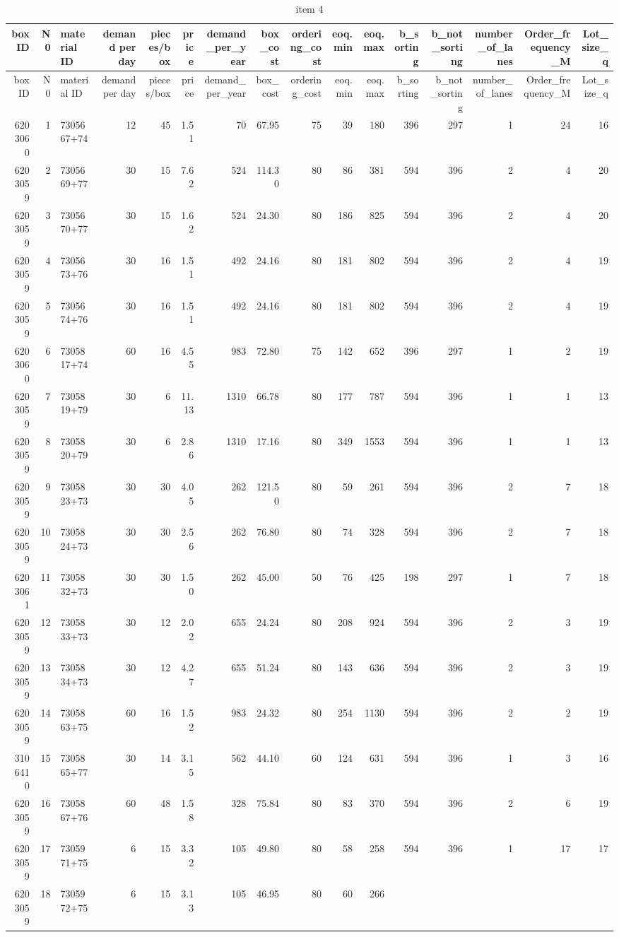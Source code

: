 \documentclass[
]{article}
\begin{document}
\begin{longtable}[]{@{}rrlrrrrrrrrrrrrr@{}}
\caption{item 4}\tabularnewline
\toprule
box ID & N0 & material ID & demand per day & pieces/box & price &
demand\_per\_year & box\_cost & ordering\_cost & eoq.min & eoq.max &
b\_sorting & b\_not\_sorting & number\_of\_lanes & Order\_frequency\_M &
Lot\_size\_q\tabularnewline
\midrule
\endfirsthead
\toprule
box ID & N0 & material ID & demand per day & pieces/box & price &
demand\_per\_year & box\_cost & ordering\_cost & eoq.min & eoq.max &
b\_sorting & b\_not\_sorting & number\_of\_lanes & Order\_frequency\_M &
Lot\_size\_q\tabularnewline
\midrule
\endhead
6203060 & 1 & 7305667+74 & 12 & 45 & 1.51 & 70 & 67.95 & 75 & 39 & 180 &
396 & 297 & 1 & 24 & 16\tabularnewline
6203059 & 2 & 7305669+77 & 30 & 15 & 7.62 & 524 & 114.30 & 80 & 86 & 381
& 594 & 396 & 2 & 4 & 20\tabularnewline
6203059 & 3 & 7305670+77 & 30 & 15 & 1.62 & 524 & 24.30 & 80 & 186 & 825
& 594 & 396 & 2 & 4 & 20\tabularnewline
6203059 & 4 & 7305673+76 & 30 & 16 & 1.51 & 492 & 24.16 & 80 & 181 & 802
& 594 & 396 & 2 & 4 & 19\tabularnewline
6203059 & 5 & 7305674+76 & 30 & 16 & 1.51 & 492 & 24.16 & 80 & 181 & 802
& 594 & 396 & 2 & 4 & 19\tabularnewline
6203060 & 6 & 7305817+74 & 60 & 16 & 4.55 & 983 & 72.80 & 75 & 142 & 652
& 396 & 297 & 1 & 2 & 19\tabularnewline
6203059 & 7 & 7305819+79 & 30 & 6 & 11.13 & 1310 & 66.78 & 80 & 177 &
787 & 594 & 396 & 1 & 1 & 13\tabularnewline
6203059 & 8 & 7305820+79 & 30 & 6 & 2.86 & 1310 & 17.16 & 80 & 349 &
1553 & 594 & 396 & 1 & 1 & 13\tabularnewline
6203059 & 9 & 7305823+73 & 30 & 30 & 4.05 & 262 & 121.50 & 80 & 59 & 261
& 594 & 396 & 2 & 7 & 18\tabularnewline
6203059 & 10 & 7305824+73 & 30 & 30 & 2.56 & 262 & 76.80 & 80 & 74 & 328
& 594 & 396 & 2 & 7 & 18\tabularnewline
6203061 & 11 & 7305832+73 & 30 & 30 & 1.50 & 262 & 45.00 & 50 & 76 & 425
& 198 & 297 & 1 & 7 & 18\tabularnewline
6203059 & 12 & 7305833+73 & 30 & 12 & 2.02 & 655 & 24.24 & 80 & 208 &
924 & 594 & 396 & 2 & 3 & 19\tabularnewline
6203059 & 13 & 7305834+73 & 30 & 12 & 4.27 & 655 & 51.24 & 80 & 143 &
636 & 594 & 396 & 2 & 3 & 19\tabularnewline
6203059 & 14 & 7305863+75 & 60 & 16 & 1.52 & 983 & 24.32 & 80 & 254 &
1130 & 594 & 396 & 2 & 2 & 19\tabularnewline
3106410 & 15 & 7305865+77 & 30 & 14 & 3.15 & 562 & 44.10 & 60 & 124 &
631 & 594 & 396 & 1 & 3 & 16\tabularnewline
6203059 & 16 & 7305867+76 & 60 & 48 & 1.58 & 328 & 75.84 & 80 & 83 & 370
& 594 & 396 & 2 & 6 & 19\tabularnewline
6203059 & 17 & 7305971+75 & 6 & 15 & 3.32 & 105 & 49.80 & 80 & 58 & 258
& 594 & 396 & 1 & 17 & 17\tabularnewline
6203059 & 18 & 7305972+75 & 6 & 15 & 3.13 & 105 & 46.95 & 80 & 60 & 266

\end{longtable}
\end{document}
